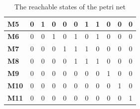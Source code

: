 \documentclass[11pt]{article}
\begin{document}
\begin{table}[]
\begin{tabular}{l|c|c|c|c|c|c|c|c|c|c|}
\textbf{M5}  & 0                                                            & 1              & 0               & 0                & 0           & 1            & 1            & 0                & 0                                                             & 0                                                            \\ \hline
\textbf{M6}  & 0                                                            & 0              & 1               & 0                & 1           & 0            & 1            & 0                & 0                                                             & 0                                                            \\ \hline
\textbf{M7}  & 0                                                            & 0              & 0               & 1                & 1           & 1            & 0            & 0                & 0                                                             & 0                                                            \\ \hline
\textbf{M8}  & 0                                                            & 0              & 0               & 0                & 1           & 1            & 1            & 0                & 0                                                             & 0                                                            \\ \hline
\textbf{M9}  & 0                                                            & 0              & 0               & 0                & 0           & 0            & 0            & 1                & 0                                                             & 0                                                            \\ \hline
\textbf{M10} & 0                                                            & 0              & 0               & 0                & 0           & 0            & 0            & 0                & 1                                                             & 0                                                            \\ \hline
\textbf{M11} & 0                                                            & 0              & 0               & 0                & 0           & 0            & 0            & 0                & 0                                                             & 1                                                            \\ \hline
\end{tabular}
\caption{The reachable states of the petri net}
\label{table:states}
\end{table}
\end{document}
